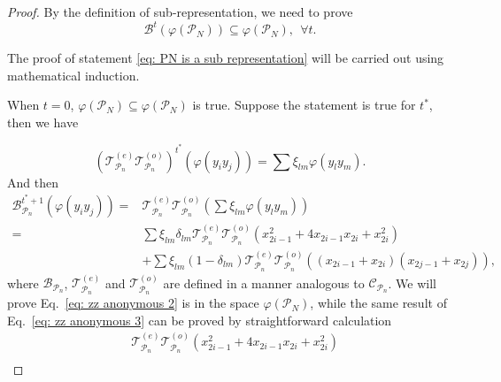 \documentclass[journal=jctcce,a4paper,manuscript=article]{achemso}
\newcommand{\Tcal}{\mathcal{T}}
\begin{document}
\begin{proof}
  By the definition of sub-representation, we need to prove
  \begin{equation}
    \label{eq: PN is a sub representation}
    \mathcal{B}^t (\varphi(\mathcal{P}_N)) \subseteq \varphi(\mathcal{P}_N), ~~\forall t .
  \end{equation}

  The proof of statement \eqref{eq: PN is a sub representation} will be carried
  out using mathematical induction.

  When $t=0$, $\varphi(\mathcal{P}_N)\subseteq \varphi(\mathcal{P}_N)$ is true.
  Suppose the statement is true for $t^*$, then we have

  \begin{equation}
    (\Tcal^{(e)}_{\mathcal{P}_n}\Tcal^{(o)}_{\mathcal{P}_n})^{t^*}(\varphi(y_iy_j)) = \sum \xi_{lm} \varphi(y_ly_m).
  \end{equation}
  And then
  \begin{align}
    \mathcal{B}_{\mathcal{P}_n}  ^{t^*+1}(\varphi(y_i y_j)) = &
    \Tcal^{(e)}_{\mathcal{P}_n}\Tcal^{(o)}_{\mathcal{P}_n} (\sum \xi_{lm} \varphi(y_ly_m))                                                                                                                                      \\
    \label{eq: zz anonymous 2}
    =                                                         & \sum \xi_{lm} \delta_{lm}\Tcal^{(e)}_{\mathcal{P}_n}\Tcal^{(o)}_{\mathcal{P}_n} ( x_{2i-1}^2+4 x_{2i-1} x_{2i}+x_{2i}^2)                                        \\
    \label{eq: zz anonymous 3}
                                                              & + \sum \xi_{lm} (1-\delta_{lm})\Tcal^{(e)}_{\mathcal{P}_n}\Tcal^{(o)}_{\mathcal{P}_n}\left(\left(x_{2 i-1}+x_{2 i}\right)\left(x_{2 j-1}+x_{2 j}\right)\right),
  \end{align}
  where $\mathcal{B}_{\mathcal{P}_n}$,  $\Tcal^{(e)}_{\mathcal{P}_n}$ and $\Tcal^{(o)}_{\mathcal{P}_n}$ are defined in a manner analogous to $\mathcal{C}_{\mathcal{P}_n}$.
  We will prove Eq.~\eqref{eq: zz anonymous 2} is in the space $\varphi(\mathcal{P}_N)$, while the same result of Eq.~\eqref{eq: zz anonymous 3} can be proved by straightforward calculation
  \begin{equation}
    \begin{aligned}
      \label{eq: zz anonymous 4}
        & \Tcal^{(e)}_{\mathcal{P}_n}\Tcal^{(o)}_{\mathcal{P}_n} ( x_{2i-1}^2+4 x_{2i-1} x_{2i}+x_{2i}^2)                                                                                  \\

\end{aligned}
\end{equation}
\end{proof}
\end{document}
